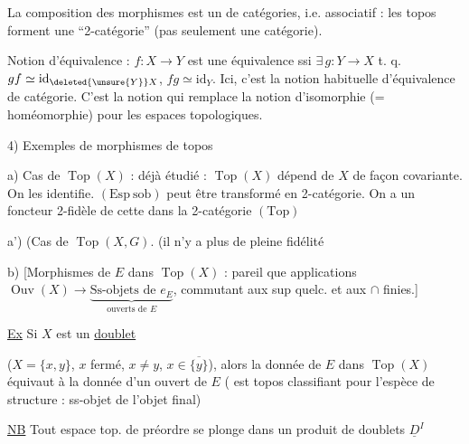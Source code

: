 
La composition des morphismes est un   de catégories, i.e. associatif : les topos forment une ``2-catégorie'' (pas seulement une catégorie).


Notion d'équivalence  : $f:X\to Y$ est une équivalence ssi $\exists\,g:Y\to X$ t. q. $gf\simeq\mathrm{id}_{\deleted{\unsure{Y}}X}$, $fg\simeq\mathrm{id}_Y$. Ici, c'est la notion habituelle d'équivalence de catégorie. C'est la notion qui remplace la notion d'isomorphie (= homéomorphie) pour les espaces topologiques.

4) Exemples de morphismes de topos

a) Cas de $\operatorname{Top}(X)$ : déjà étudié : $\operatorname{Top}(X)$ dépend de $X$ de façon covariante. On les identifie. $(\mathrm{Esp\ sob})$ \deleted{\unsure{$\to$}} peut être transformé en 2-catégorie. On a un foncteur 2-fidèle de cette  dans la 2-catégorie $(\mathrm{Top})$

a') (Cas de $\operatorname{Top}(X,G)$.  (il n'y a plus de pleine fidélité

b) [Morphismes de $E$ dans $\operatorname{Top}(X)$ : pareil que  applications $\operatorname{Ouv}(X)\longrightarrow\underbrace{\text{Ss-objets de }e_E}_{\text{ouverts de }E}$, commutant aux sup quelc. et aux $\cap$ finies.]

\uline{Ex} Si $X$ est un \uline{doublet} 


($X=\{x,y\}$,   $x$ fermé, $x\ne y$, $x\in\overline{\{y\}}$), alors la donnée de $E$ dans $\operatorname{Top}(X)$ équivaut à la donnée d'un ouvert de $E$ (  est topos classifiant pour l'espèce de structure : ss-objet de l'objet final)

\uline{NB} Tout espace top. de préordre se plonge dans un produit de doublets $\underline D^{I}$

